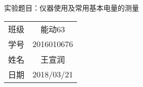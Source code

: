 \documentclass{article}
\begin{document}
 

\begin{center}

	\begin{Large}
	实验题目：\hspace{1cm}仪器使用及常用基本电量的测量
	\end{Large}

	\vspace{2cm}

	\begin{large}
	\begin{tabular}{|c|c|}

		班级&能动63\\

		学号&2016010676\\

		姓名&王宣润\\

		日期&2018/03/21\\

	\end{tabular}
	\end{large}

\end{center}

\newpage
\end{document}
